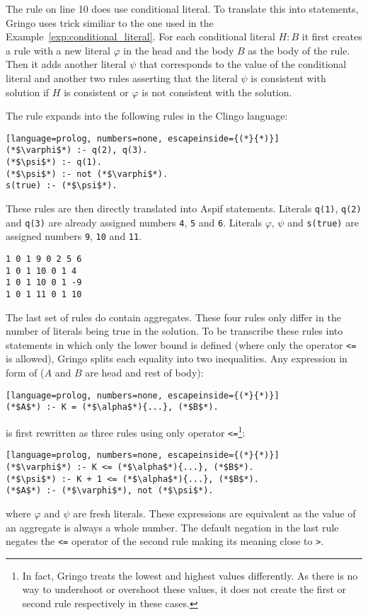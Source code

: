 \begin{example}
    The rule on line 10 does use conditional literal.
    To translate this into statements, Gringo uses trick similiar to the one used
    in the Example~\ref{exp:conditional_literal}.
    For each conditional literal $H : B$ it first creates a rule with a new literal
    $\varphi$ in the head and the body $B$ as the body of the rule.
    Then it adds another literal $\psi$ that corresponds to the value of
    the conditional literal and another two rules asserting that the literal
    $\psi$ is consistent with solution if $H$ is consistent or
    $\varphi$ is not consistent with the solution.

    The rule expands into the following rules in the Clingo language:
    \begin{lstlisting}[language=prolog, numbers=none, escapeinside={(*}{*)}]
(*$\varphi$*) :- q(2), q(3).
(*$\psi$*) :- q(1).
(*$\psi$*) :- not (*$\varphi$*).
s(true) :- (*$\psi$*).
\end{lstlisting}
    These rules are then directly translated into Aspif statements.
    Literals \texttt{q(1)}, \texttt{q(2)} and \texttt{q(3)} are already
    assigned numbers \texttt{4}, \texttt{5} and \texttt{6}. Literals
    $\varphi$, $\psi$ and \texttt{s(true)} are assigned numbers 
    \texttt{9}, \texttt{10} and \texttt{11}.
    \begin{lstlisting}[firstnumber=10]
1 0 1 9 0 2 5 6
1 0 1 10 0 1 4
1 0 1 10 0 1 -9
1 0 1 11 0 1 10
\end{lstlisting}

    The last set of rules do contain aggregates. These four rules only differ
    in the number of literals being true in the solution.
    To be transcribe these rules into statements in which only the lower bound
    is defined (where only the operator \texttt{<=} is allowed),
    Gringo splits each equality into two inequalities. Any expression
    in form of ($A$ and $B$ are head and rest of body):
    \begin{lstlisting}[language=prolog, numbers=none, escapeinside={(*}{*)}]
(*$A$*) :- K = (*$\alpha$*){...}, (*$B$*).
\end{lstlisting}
    is first rewritten as three rules using only operator \texttt{<=}\footnote{
        In fact, Gringo treats the lowest and highest values differently.
        As there is no way to undershoot or overshoot these values,
        it does not create the first or second rule respectively in these cases.
    }:
    \begin{lstlisting}[language=prolog, numbers=none, escapeinside={(*}{*)}]
(*$\varphi$*) :- K <= (*$\alpha$*){...}, (*$B$*).
(*$\psi$*) :- K + 1 <= (*$\alpha$*){...}, (*$B$*).
(*$A$*) :- (*$\varphi$*), not (*$\psi$*).
\end{lstlisting}
    where $\varphi$ and $\psi$ are fresh literals.
    These expressions are equivalent as the value of an aggregate is always
    a whole number. The default negation in the last rule negates the \texttt{<=}
    operator of the second rule making its meaning close to \texttt{>}.


\end{example}
